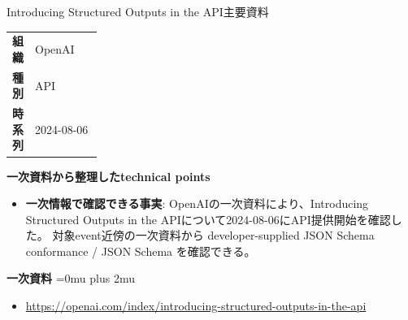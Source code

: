 \begin{technicalnote}{Introducing Structured Outputs in the API}{主要資料}
\begingroup
\begin{tabularx}{\linewidth}{@{}>{\bfseries}p{0.22\linewidth}X@{}}
組織 & OpenAI \\
種別 & API \\
時系列 & 2024-08-06 \\
\end{tabularx}
\smallskip
{\bfseries 一次資料から整理したtechnical points}
\begin{itemize}[leftmargin=1.5em,itemsep=0.35em]
\item \textbf{一次情報で確認できる事実}: OpenAIの一次資料により、Introducing Structured Outputs in the APIについて2024-08-06にAPI提供開始を確認した。 対象event近傍の一次資料から developer-supplied JSON Schema conformance / JSON Schema を確認できる。
\end{itemize}
\begin{minipage}{\linewidth}
\begin{samepage}
{\bfseries 一次資料}
\begingroup\sloppy
\Urlmuskip=0mu plus 2mu\relax
\begin{itemize}[leftmargin=1.5em,itemsep=0.25em]
\item {\scriptsize\url{https://openai.com/index/introducing-structured-outputs-in-the-api}}
\end{itemize}
\endgroup
\end{samepage}
\end{minipage}
\endgroup
\end{technicalnote}
\medskip

